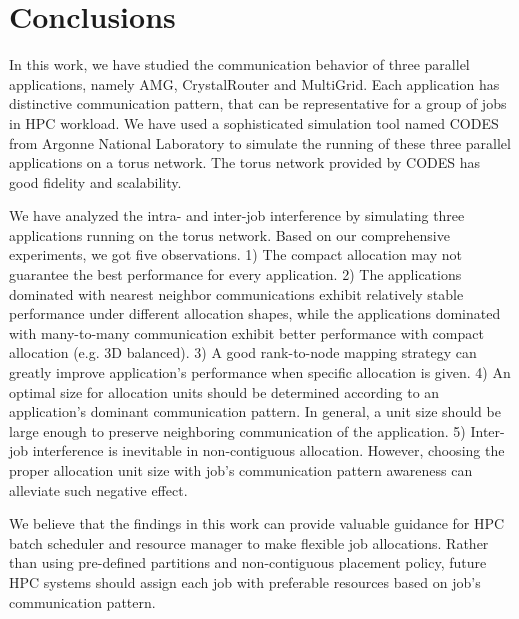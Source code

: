 \section{Conclusions}
\label{sec:conclusion}
In this work, we have studied the communication behavior of three parallel applications, 
namely AMG, CrystalRouter and MultiGrid. 
Each application has distinctive communication pattern, 
that can be representative for a group of jobs in HPC workload. 
We have used a sophisticated simulation tool named CODES from Argonne National Laboratory 
to simulate the running of these three parallel applications on a torus network. 
The torus network provided by CODES has good fidelity and scalability. 

We have analyzed the intra- and inter-job interference by simulating three applications running on the torus network. 
Based on our comprehensive experiments, we got five observations. 
1) The compact allocation may not guarantee the best performance for every application. 
2) The applications dominated with nearest neighbor communications exhibit 
relatively stable performance under different allocation shapes, 
while the applications dominated with many-to-many communication exhibit 
better performance with compact allocation (e.g. 3D balanced). 
3) A good rank-to-node mapping strategy can greatly improve application's performance when specific allocation is given. 
4) An optimal size for allocation units should be determined according to 
an application's dominant communication pattern. 
In general, a unit size should be large enough to preserve neighboring communication of the application. 
5) Inter-job interference is inevitable in non-contiguous allocation. 
However, choosing the proper allocation unit size with job's communication pattern awareness can alleviate such negative effect.


We believe that the findings in this work can provide valuable guidance 
for HPC batch scheduler and resource manager to make flexible job allocations. 
Rather than using pre-defined partitions and non-contiguous placement policy, 
future HPC systems should assign each job with preferable resources based on job's communication pattern. 

